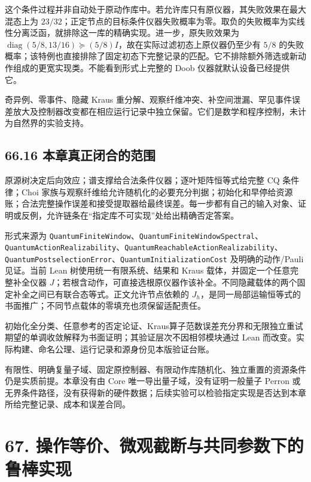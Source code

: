 \documentclass[
  11pt,
  oneside]{book}
\begin{document}
这个条件过程并非自动处于原动作库中。若允许库只有原仪器，其失败效果在最大混态上为
\(23/32\)；正定节点的目标条件仪器失败概率为零。取负的失败概率为实线性分离泛函，就排除这一库的精确实现。进一步，原失败效果为
\(\operatorname{diag}(5/8,13/16)\succeq(5/8)I\)，故在实际过滤初态上原仪器仍至少有
\(5/8\)
的失败概率；该特例也直接排除了固定初态下完整记录的匹配。它不排除额外筛选或新动作组成的更宽实现类。不能看到形式上完整的
Doob 仪器就默认设备已经提供它。

奇异例、零事件、隐藏 Kraus
重分解、观察纤维冲突、补空间泄漏、罕见事件误差放大及控制器改变都在相应运行记录中独立保留。它们是数学和程序控制，未计为自然界的实验支持。

\section{66.16 本章真正闭合的范围}

原源树决定后向效应；谱支撑给合法条件仪器；逐叶矩阵恒等式给完整 CQ
条件律；Choi
家族与观察纤维给允许随机化的必要充分判据；初始化和早停给资源账；合法完整操作误差和接受提取器给最终误差。每一步都有自己的输入对象、证明或反例，允许链条在``指定库不可实现''处给出精确否定答案。

形式来源为
\texttt{Quantum\allowbreak Finite\allowbreak Window}、\allowbreak \texttt{Quantum\allowbreak Finite\allowbreak Window\allowbreak Spectral}、\allowbreak \texttt{Quantum\allowbreak Action\allowbreak Realizability}、\allowbreak \texttt{Quantum\allowbreak Reachable\allowbreak Action\allowbreak Realizability}、\allowbreak \texttt{Quantum\allowbreak Postselection\allowbreak Error}、\allowbreak \texttt{Quantum\allowbreak Initialization\allowbreak Cost}
及明确的动作/Pauli见证。当前 Lean 树使用统一有限系统、结果和 Kraus
载体，并固定一个任意完整补全仪器
\(J\)；若根含动作，可直接选根原仪器作该补全。不同隐藏载体的两个固定补全之间已有联合态等式。正文允许节点依赖的
\(J_h\)，是同一局部运输恒等式的书面推广；不同节点载体的零填充也须保留适配责任。

初始化全分类、任意参考的否定论证、Kraus算子范数误差充分界和无限独立重试期望的单调收敛解释为书面证明；其验证层次不因相邻模块通过
Lean 而改变。实际构建、命名公理、运行记录和源身份见本版验证台账。

有限性、明确复量子域、固定原控制器、有限动作库随机化、独立重置的资源条件仍是实质前提。本章没有由
Core 唯一导出量子域，没有证明一般量子 Perron
或无界条件路径，没有获得新的硬件数据；后续实验可以检验指定实现是否达到本章所给完整记录、成本和误差合同。

\chapter{67. 操作等价、微观截断与共同参数下的鲁棒实现}\label{ch-67}\hypertarget{ch-67}{}
\end{document}
